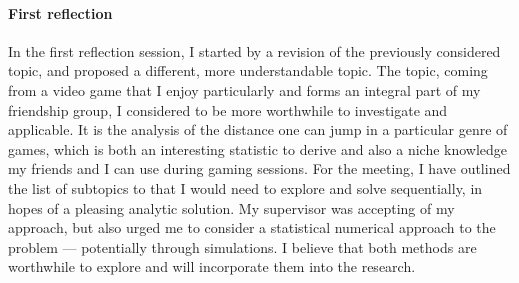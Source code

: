 \documentclass[a4paper,12pt]{article}
\begin{document}
\paragraph{First reflection}
In the first reflection session, I started by a revision of the previously considered topic, and proposed a different, more understandable topic. The topic, coming from a video game that I enjoy particularly and forms an integral part of my friendship group, I considered to be more worthwhile to investigate and applicable. It is the analysis of the distance one can jump in a particular genre of games, which is both an interesting statistic to derive and also a niche knowledge my friends and I can use during gaming sessions. For the meeting, I have outlined the list of subtopics to that I would need to explore and solve sequentially, in hopes of a pleasing analytic solution. My supervisor was accepting of my approach, but also urged me to consider a statistical numerical approach to the problem --- potentially through simulations. I believe that both methods are worthwhile to explore and will incorporate them into the research.
\end{document}
